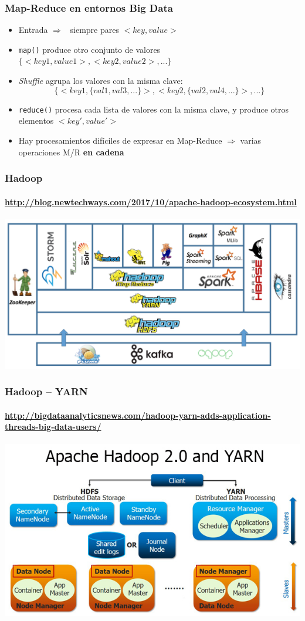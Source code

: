 \documentclass[14pt]{beamer}
\newcommand{\ra}{{\color{mdwrojo} $\Rightarrow${}~{}}}
\begin{document}
\begin{frame}
\frametitle{Map-Reduce en entornos Big Data}
\begin{itemize}
  \item Entrada \ra{} siempre pares $<key,value>$

  \item {\tt map()} produce otro conjunto de valores
    $\{<key1,value1>,<key2,value2>,...\}$

\item {\em Shuffle} agrupa los valores con la misma clave:
\begin{displaymath}
\{<key1,\{val1,val3,...\}>,<key2,\{val2,val4,...\}>,...\}
\end{displaymath}

\item {\tt reduce()} procesa cada lista de valores con la misma clave, y
  produce otros elementos $<key',value'>$

\item Hay procesamientos difíciles de expresar en Map-Reduce $\Rightarrow$
  varias operaciones M/R {\bf en cadena}
  \end{itemize}

\end{frame}

\begin{frame}
  \frametitle{Hadoop}
  \framesubtitle{\url{http://blog.newtechways.com/2017/10/apache-hadoop-ecosystem.html}}
  \includegraphics[width=\textwidth]{img/hadoop}
\end{frame}

\begin{frame}
  \frametitle{Hadoop -- YARN}
 \framesubtitle{\url{http://bigdataanalyticsnews.com/hadoop-yarn-adds-application-threads-big-data-users/}}
  \includegraphics[width=\textwidth]{img/hadoop-yarn}
\end{frame}
\end{document}

